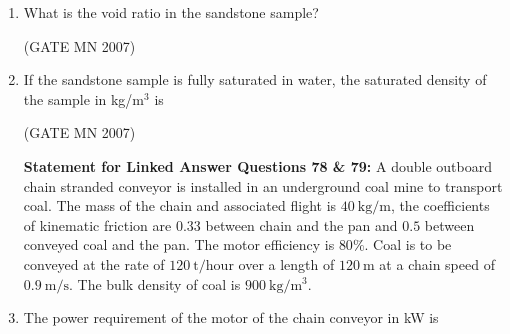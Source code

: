\documentclass[journal]{IEEEtran}
\begin{document}
\begin{enumerate}
\item What is the void ratio in the sandstone sample?  
    \begin{enumerate}
    \end{enumerate}

    \hfill (GATE MN 2007)

    \item If the sandstone sample is fully saturated in water, the saturated density of the sample in kg/m$^3$ is  
    \begin{enumerate}
    \end{enumerate}

    \hfill (GATE MN 2007)


\textbf{Statement for Linked Answer Questions 78 \& 79:} A double outboard chain stranded conveyor is installed in an underground coal mine to transport coal. 
The mass of the chain and associated flight is $40 \ \mathrm{kg/m}$, the coefficients of kinematic friction are $0.33$ between chain and the pan and $0.5$ between conveyed coal and the pan. 
The motor efficiency is $80\%$. 
Coal is to be conveyed at the rate of $120 \ \mathrm{t/hour}$ over a length of $120 \ \mathrm{m}$ at a chain speed of $0.9 \ \mathrm{m/s}$. 
The bulk density of coal is $900 \ \mathrm{kg/m^3}$.
\item The power requirement of the motor of the chain conveyor in kW is  
\begin{enumerate}
\end{enumerate}


\end{enumerate}
\end{document}
